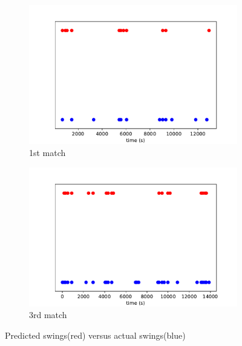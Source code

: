 \documentclass[11pt,a4paper]{article}
\begin{document}
	
	\begin{figure}[H]
		\centering
		
		\begin{subfigure}[b]{\textwidth}
			\includegraphics[width=1\linewidth]{pics/fig7_0}
			\caption{1st match}
			\label{fig:topfig7_0}
		\end{subfigure}
		
		\vspace{1cm}
		
		\begin{subfigure}[b]{\textwidth}
			\includegraphics[width=1\linewidth]{pics/fig7_3}
			\caption{3rd match}
			\label{fig:bottom}
		\end{subfigure}
		
		\caption{Predicted swings(red) versus actual swings(blue)}
		\label{fig:both_figures}
	\end{figure}
	
\end{document}
